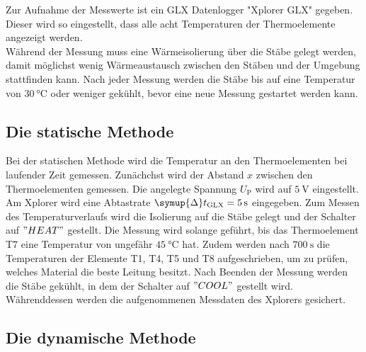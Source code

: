     Zur Aufnahme der Messwerte ist ein GLX Datenlogger "Xplorer GLX" gegeben.
    Dieser wird so eingestellt, dass alle acht Temperaturen der Thermoelemente angezeigt werden.\\

    Während der Messung muss eine Wärmeisolierung über die Stäbe gelegt werden,
    damit möglichst wenig Wärmeaustausch zwischen den Stäben und der Umgebung stattfinden kann.
    Nach jeder Messung werden die Stäbe bis auf eine Temperatur von $\SI{30}{\celsius}$ oder 
    weniger gekühlt, bevor eine neue Messung gestartet werden kann.

\subsection{Die statische Methode}

    Bei der statischen Methode wird die Temperatur an den Thermoelementen bei 
    laufender Zeit gemessen.
    Zunächchst wird der Abstand $x$ zwischen den Thermoelementen gemessen.
    Die angelegte Spannung $U_\text{P}$ wird auf $\SI{5}{\volt}$ eingestellt.
    Am Xplorer wird eine Abtastrate $\symup{\Delta} t_\text{GLX} = \SI{5}{\second}$ eingegeben.
    Zum Messen des Temperaturverlaufs wird die Isolierung auf die Stäbe gelegt und der Schalter auf $"HEAT"$ gestellt.
    Die Messung wird solange geführt, bis das Thermoelement T7 eine Temperatur von ungefähr $\SI{45}{\celsius}$ hat.
    Zudem werden nach $\SI{700}{\second}$ die Temperaturen der Elemente T1, T4, T5 und T8 aufgeschrieben, um 
    zu prüfen, welches Material die beste Leitung besitzt.
    Nach Beenden der Messung werden die Stäbe gekühlt, in dem der Schalter auf $"COOL"$ gestellt wird.
    Währenddessen werden die aufgenommenen Messdaten des Xplorers gesichert.

\subsection{Die dynamische Methode}

